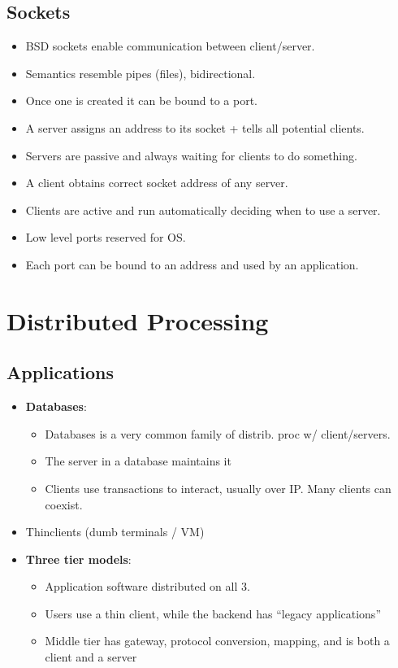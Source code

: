 \documentclass[fontsize=4.5pt]{scrartcl}
\begin{document}
\begin{multicols}{3}
      \subsection{Sockets}
        \begin{itemize}
          \item BSD sockets enable communication between client/server.
          \item Semantics resemble pipes (files), bidirectional.
          \item Once one is created it can be bound to a port.
          \item A server assigns an address to its socket + tells all potential clients.
          \item Servers are passive and always waiting for clients to do something.
          \item A client obtains correct socket address of any server.
          \item Clients are active and run automatically deciding when to use a server.
          \item Low level ports reserved for OS.
          \item Each port can be bound to an address and used by an application.
        \end{itemize}
  \section{Distributed Processing}
    \subsection{Applications}
      \begin{itemize}
        \item \textbf{Databases}:
        \begin{itemize}
          \item Databases is a very common family of distrib. proc w/ client/servers.
          \item The server in a database maintains it
          \item Clients use transactions to interact, usually over IP. Many clients can coexist.
        \end{itemize}
        \item Thinclients (dumb terminals / VM)
        \item \textbf{Three tier models}:
        \begin{itemize}
          \item Application software distributed on all 3.
          \item Users use a thin client, while the backend has ``legacy applications''
          \item Middle tier has gateway, protocol conversion, mapping, and is both a client and a server
        \end{itemize}
      \end{itemize}

\end{multicols}
\end{document}
